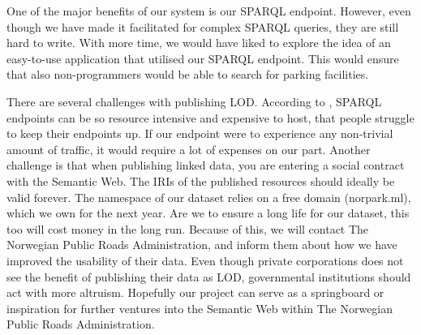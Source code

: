 \vspace{5mm}

One of the major benefits of our system is our SPARQL endpoint. However, even though we have made it facilitated for complex SPARQL queries, they are still hard to write. With more time, we would have liked to explore the idea of an easy-to-use application that utilised our SPARQL endpoint. This would ensure that also non-programmers would be able to search for parking facilities.

\vspace{5mm}

There are several challenges with publishing LOD. According to \cite{can-i-sparql-your-endpoint}, SPARQL endpoints can be so resource intensive and expensive to host, that people struggle to keep their endpoints up. If our endpoint were to experience any non-trivial amount of traffic, it would require a lot of expenses on our part. Another challenge is that when publishing linked data, you are entering a social contract with the Semantic Web. The IRIs of the published resources should ideally be valid forever. The namespace of our dataset relies on a free domain (norpark.ml), which we own for the next year. Are we to ensure a long life for our dataset, this too will cost money in the long run. Because of this, we will contact The Norwegian Public Roads Administration, and inform them about how we have improved the usability of their data. Even though private corporations does not see the benefit of publishing their data as LOD, governmental institutions should act with more altruism. Hopefully our project can serve as a springboard or inspiration for further ventures into the Semantic Web within The Norwegian Public Roads Administration.

